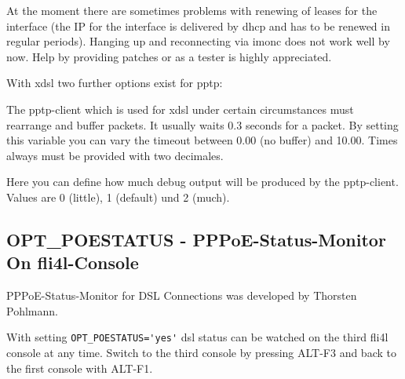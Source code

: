 At the moment there are sometimes problems with renewing of leases for
the interface (the IP for the interface is delivered by dhcp and
has to be renewed in regular periods). Hanging up and reconnecting 
via imonc does not work well by now. Help by providing patches 
or as a tester is highly appreciated.

With xdsl two further options exist for pptp:

\begin{description}

The pptp-client which is used for xdsl under certain circumstances must 
rearrange and buffer packets. It usually waits 0.3 seconds for a packet. 
By setting this variable you can vary the timeout between 0.00 (no buffer) 
and 10.00. Times always must be provided with two decimales.


Here you can define how much debug output will be produced by the 
pptp-client. Values are 0 (little), 1 (default) und 2 (much).

\end{description}

\subsection {OPT\_POESTATUS - PPPoE-Status-Monitor On fli4l-Console}

    PPPoE-Status-Monitor for DSL Connections was developed by Thorsten Pohlmann.

    With setting \verb*?OPT_POESTATUS='yes'? dsl status can be watched 
    on the third fli4l console at any time. Switch to the third console 
    by pressing ALT-F3 and back to the first console with ALT-F1.
